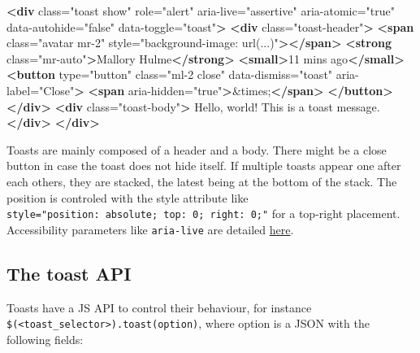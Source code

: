 \documentclass[
]{book}
\newenvironment{Shaded}{\begin{snugshade}}{\end{snugshade}}
\newcommand{\DecValTok}[1]{\textcolor[rgb]{0.00,0.00,0.81}{#1}}
\newcommand{\KeywordTok}[1]{\textcolor[rgb]{0.13,0.29,0.53}{\textbf{#1}}}
\newcommand{\NormalTok}[1]{#1}
\newcommand{\OtherTok}[1]{\textcolor[rgb]{0.56,0.35,0.01}{#1}}
\newcommand{\StringTok}[1]{\textcolor[rgb]{0.31,0.60,0.02}{#1}}
\begin{document}
\begin{Shaded}
\begin{Highlighting}[]
\KeywordTok{<div}\OtherTok{ class=}\StringTok{"toast show"}\OtherTok{ role=}\StringTok{"alert"}\OtherTok{ aria-live=}\StringTok{"assertive"}\OtherTok{ aria-atomic=}\StringTok{"true"}\OtherTok{ data-autohide=}\StringTok{"false"}\OtherTok{ data-toggle=}\StringTok{"toast"}\KeywordTok{>}
  \KeywordTok{<div}\OtherTok{ class=}\StringTok{"toast-header"}\KeywordTok{>}
    \KeywordTok{<span}\OtherTok{ class=}\StringTok{"avatar mr-2"}\OtherTok{ style=}\StringTok{"background-image: url(...)"}\KeywordTok{></span>}
    \KeywordTok{<strong}\OtherTok{ class=}\StringTok{"mr-auto"}\KeywordTok{>}\NormalTok{Mallory Hulme}\KeywordTok{</strong>}
    \KeywordTok{<small>}\NormalTok{11 mins ago}\KeywordTok{</small>}
    \KeywordTok{<button}\OtherTok{ type=}\StringTok{"button"}\OtherTok{ class=}\StringTok{"ml-2 close"}\OtherTok{ data-dismiss=}\StringTok{"toast"}\OtherTok{ aria-label=}\StringTok{"Close"}\KeywordTok{>}
      \KeywordTok{<span}\OtherTok{ aria-hidden=}\StringTok{"true"}\KeywordTok{>}\DecValTok{&times;}\KeywordTok{</span>}
    \KeywordTok{</button>}
  \KeywordTok{</div>}
  \KeywordTok{<div}\OtherTok{ class=}\StringTok{"toast-body"}\KeywordTok{>}
\NormalTok{  Hello, world! This is a toast message.}
  \KeywordTok{</div>}
\KeywordTok{</div>}
\end{Highlighting}
\end{Shaded}

Toasts are mainly composed of a header and a body. There might be a close button in case the toast does not hide itself. If multiple toasts appear one after each others, they are stacked, the latest being at the bottom of the stack. The position is controled with the style attribute like \texttt{style="position:\ absolute;\ top:\ 0;\ right:\ 0;"} for a top-right placement. Accessibility parameters like \texttt{aria-live} are detailed \href{https://getbootstrap.com/docs/4.3/components/toasts/\#accessibility}{here}.

\hypertarget{the-toast-api}{%
\subsection{The toast API}\label{the-toast-api}}

Toasts have a JS API to control their behaviour, for instance \texttt{\$(\textquotesingle{}\textless{}toast\_selector\textgreater{}\textquotesingle{}).toast(option)}, where option is a JSON with the following fields:
\end{document}
